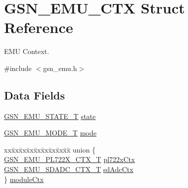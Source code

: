 \hypertarget{a00059}{
\section{GSN\_\-EMU\_\-CTX Struct Reference}
\label{a00059}
}


EMU Context.  




{\ttfamily \#include $<$gsn\_\-emu.h$>$}

\subsection*{Data Fields}
\begin{DoxyCompactItemize}
\item 
\hyperlink{a00663_gab09444b3018b5461230d789c746b56a0}{GSN\_\-EMU\_\-STATE\_\-T} \hyperlink{a00059_a8e4e413d6cdd8ed5d0b00352c705e870}{state}
\item 
\hyperlink{a00663_gafbaa4d30aa4b736f3465344d6a5935b0}{GSN\_\-EMU\_\-MODE\_\-T} \hyperlink{a00059_a1174c25ab9eb5a4d0559dc01ef4362d4}{mode}
\item 
\begin{tabbing}
xx\=xx\=xx\=xx\=xx\=xx\=xx\=xx\=xx\=\kill
union \{\\
\>\hyperlink{a00065}{GSN\_EMU\_PL722X\_CTX\_T} \hyperlink{a00059_a3b1676d377e919c2a6e4e2de63885f5a}{pl722xCtx}\\
\>\hyperlink{a00066}{GSN\_EMU\_SDADC\_CTX\_T} \hyperlink{a00059_a1ecea336f1ec46a2bc1fe898b676a533}{sdAdcCtx}\\
\} \hyperlink{a00059_add10e330d91fd521da66792db609c654}{moduleCtx}\\


\end{tabbing}
\end{DoxyCompactItemize}

